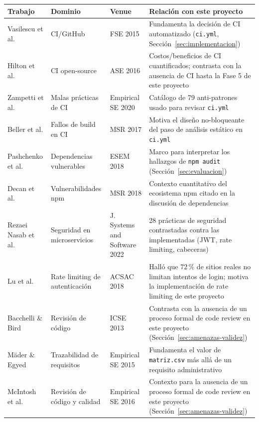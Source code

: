 \begin{table}[H]
\centering
\small
\begin{tabular}{p{2.6cm}p{2cm}p{1.8cm}p{6.2cm}}
\toprule
\textbf{Trabajo} & \textbf{Dominio} & \textbf{Venue} & \textbf{Relación con este proyecto} \\
\midrule
Vasilescu et al. \cite{vasilescu2015} & CI/GitHub & FSE 2015 & Fundamenta la decisión de CI automatizado (\texttt{ci.yml}, Sección~\ref{sec:implementacion}) \\
Hilton et al. \cite{hilton2016} & CI open-source & ASE 2016 & Costos/beneficios de CI cuantificados; contrasta con la ausencia de CI hasta la Fase 5 de este proyecto \\
Zampetti et al. \cite{zampetti2020} & Malas prácticas de CI & Empirical SE 2020 & Catálogo de 79 anti-patrones usado para revisar \texttt{ci.yml} \\
Beller et al. \cite{beller2017} & Fallos de build en CI & MSR 2017 & Motiva el diseño no-bloqueante del paso de análisis estático en \texttt{ci.yml} \\
Pashchenko et al. \cite{pashchenko2018} & Dependencias vulnerables & ESEM 2018 & Marco para interpretar los hallazgos de \texttt{npm audit} (Sección~\ref{sec:evaluacion}) \\
Decan et al. \cite{decan2018} & Vulnerabilidades npm & MSR 2018 & Contexto cuantitativo del ecosistema npm citado en la discusión de dependencias \\
Rezaei Nasab et al. \cite{rezaeinasab2022} & Seguridad en microservicios & J. Systems and Software 2022 & 28 prácticas de seguridad contrastadas contra las implementadas (JWT, rate limiting, cabeceras) \\
Lu et al. \cite{lu2018} & Rate limiting de autenticación & ACSAC 2018 & Halló que 72\,\% de sitios reales no limitan intentos de login; motiva la implementación de rate limiting de este proyecto \\
Bacchelli \& Bird \cite{bacchelli2013} & Revisión de código & ICSE 2013 & Contrasta con la ausencia de un proceso formal de code review en este proyecto (Sección~\ref{sec:amenazas-validez}) \\
Mäder \& Egyed \cite{mader2015} & Trazabilidad de requisitos & Empirical SE 2015 & Fundamenta el valor de \texttt{matriz.csv} más allá de un requisito administrativo \\
McIntosh et al. \cite{mcintosh2016} & Revisión de código y calidad & Empirical SE 2016 & Contexto para la ausencia de un proceso formal de code review en este proyecto (Sección~\ref{sec:amenazas-validez}) \\

\end{tabular}
\end{table}
